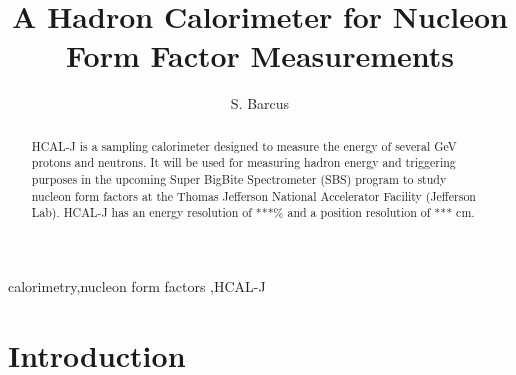 \documentclass[review]{elsarticle}
\newcommand{\hcal}{HCAL-J }
\begin{document}
\begin{frontmatter}

\title{A Hadron Calorimeter for Nucleon Form Factor Measurements}

\author[jlab]{S. Barcus}


\address[jlab]{Jefferson Laboratory}



\begin{abstract}
\hcal is a sampling calorimeter designed to measure the energy of several GeV protons and neutrons. It will be used for measuring hadron energy and triggering purposes in the upcoming Super BigBite Spectrometer (SBS) program to study nucleon form factors at the Thomas Jefferson National Accelerator Facility (Jefferson Lab). \hcal has an energy resolution of ***\% and a position resolution of *** cm. 
\end{abstract}

\begin{keyword}
calorimetry\sep nucleon form factors \sep \hcal
\end{keyword}

\end{frontmatter}

\linenumbers

\section{Introduction}
\label{intro}
\end{document}
